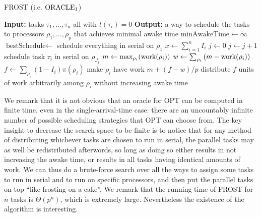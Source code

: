 \begin{algorithm}
  \caption{FROST (i.e. $\operatorname{\text{ORACLE}}_1$)}
  \label{alg:frost}
  \begin{algorithmic}
    \State \textbf{Input:} tasks $\tau_1,\ldots, \tau_n$ all with $t(\tau_i) = 0$
    \State \textbf{Output:} a way to schedule the tasks to
    processors $\rho_1, \ldots, \rho_p$ that achieves minimal awake time
    \State 
    \State $\text{minAwakeTime} \gets \infty$
    \State $\text{bestSchedule} \gets $ schedule everything in serial on $\rho_1$
      \State $x \gets \sum_{i=1}^n I_i$
        \State $j \gets 0$
            \State $j \gets j+1$
            \State schedule task $\tau_i$ in serial on $\rho_{J_j}$
          \EndIf
        \EndFor
        \State $m \gets \max_{\rho_i}(\operatorname{\text{work}}(\rho_i))$
        \State $w \gets \sum_{\rho_i} \left( m - \operatorname{\text{work}}(\rho_i) \right)$
        \State $f \gets \sum_{\rho_i} (1-I_i)\pi(\rho_i)$
          \State make $\rho_i$ have work $m + (f-w)/p$
        \Else 
          \State distribute $f$ units of work arbitrarily 
          \State among $\rho_i$ without increasing awake time
        \EndIf
        \EndIf
      \EndFor
    \EndFor
  \end{algorithmic}
\end{algorithm}

We remark that it is not obvious that an oracle for OPT can be
computed in finite time, even in the single-arrival-time case:
there are an uncountably infinite number of possible scheduling
strategies that OPT can choose from. The key insight to decrease
the search space to be finite is to notice that for any method of
distributing whichever tasks are chosen to run in serial, the
parallel tasks may as well be redistributed afterwords, so long
as doing so either results in not increasing the awake time, or
results in all tasks having identical amounts of work. We can
thus do a brute-force search over all the ways to assign some
tasks to run in serial and to run on specific processors, and
then put the parallel tasks on top \enquote{like frosting on a
cake}. We remark that the running time of FROST for $n$ tasks is
$\Theta(p^n)$, which is extremely large. Nevertheless the
existence of the algorithm is interesting. 

